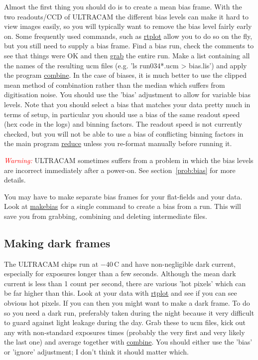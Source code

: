 \documentclass[10pt,a4paper,twocolumn]{article}
\newcommand{\main}{http://quetzel.csc.warwick.ac.uk/phsaap/software}
\newcommand{\ultracam}{\main/ultracam/html}
\newcommand{\warn}[1]{\textcolor{red}{\emph{#1}}}
\begin{document}
Almost the first thing you should do is to create a mean bias
frame. With the two readouts/CCD of ULTRACAM the different bias levels
can make it hard to view images easily, so you will typically want to
remove the bias level fairly early on. Some frequently used commands, 
such as \href{\ultracam/rtplot.html}{rtplot} allow you to do so on the fly,
but you still need to supply a bias frame. Find a bias run, check the
comments to see that things were OK and then
\href{\ultracam/grab.html}{grab} the entire run. Make a list
containing all the names of the resulting ucm files (e.g. 'ls
run034*.ucm > bias.lis') and apply the program
\href{\ultracam/combine.html}{combine}. In the case of biases, it is much
better to use the
clipped mean method of combination rather than the median which
suffers from digitisation noise. You should use the 'bias' adjustment
to allow for variable bias levels. Note that you should select a bias
that matches your data pretty much in terms of setup, in particular
you should use a bias of the same readout speed (hex code in the logs)
and binning factors. The readout speed is not currently checked, but
you will not be able to use a bias of conflicting binning factors in
the main program \href{\ultracam/reduce.html}{reduce} unless you
re-format manually before running it.

\warn{Warning:} ULTRACAM sometimes suffers from a problem in which the bias levels
are incorrect immediately after a power-on. See
section~\ref{prob:bias} for more details.

You may have to make separate bias frames for your flat-fields and your data. 
Look at \href{\ultracam/makebias.html}{makebias} for a single command to
create a bias from a run. This will save you from grabbing, combining and
deleting intermediate files.

\subsection{Making dark frames}

The ULTRACAM chips run at $-40\,$C and have non-negligible dark
current, especially for exposures longer than a few seconds. Although
the mean dark current is less than 1 count per second, there are
various 'hot pixels' which can be far higher than this. Look at
your data with \href{\ultracam/rtplot.html}{rtplot} and see if you can
see obvious hot pixels. If you can then you might want to make a dark
frame. To do so you need a dark run, preferably taken during the night
because it very difficult to guard against light leakage during the
day. Grab these to ucm files, kick out any with non-standard exposures
times (probably the very first and very likely the last one) and
average together with \href{\ultracam/combine.html}{combine}. You
should either use the 'bias' or 'ignore' adjustment; I don't think it
should matter which.
\end{document}
